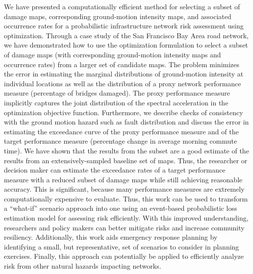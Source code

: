 We have presented a computationally efficient method for selecting a subset of damage maps, corresponding ground-motion intensity maps, and associated occurrence rates for a probabilistic infrastructure network risk assessment using optimization.
Through a case study of the San Francisco Bay Area road network, we have demonstrated how to use the optimization formulation to select a subset of damage maps (with corresponding ground-motion intensity maps and occurrence rates) from a larger set of candidate maps. The problem minimizes the error in estimating the marginal distributions of ground-motion intensity at individual locations as well as the distribution of a proxy network performance measure (percentage of bridges damaged).  The proxy performance measure implicitly captures the joint distribution of the spectral acceleration in the optimization objective function. Furthermore, we describe checks of consistency with the ground motion hazard such as fault distribution and discuss the error in estimating the exceedance curve of the proxy performance measure and of the target performance measure (percentage change in average morning commute time). We have shown that the results from the subset are a good estimate of the results from an extensively-sampled baseline set of maps. 
Thus, the researcher or decision maker can estimate the exceedance rates of a target performance measure with a reduced subset of damage maps while still achieving reasonable accuracy. This is significant, because many performance measures are extremely computationally expensive to evaluate. Thus, this work can be used to transform a ``what-if'' scenario approach into one using an event-based probabilistic loss estimation model for assessing risk efficiently. With this improved understanding, researchers and policy makers can better mitigate risks and increase community  resiliency. 
Additionally, this work aids emergency response planning by identifying a small, but representative, set of scenarios to consider in planning exercises.
Finally, this approach can potentially be applied to efficiently analyze risk from other natural hazards impacting networks.


